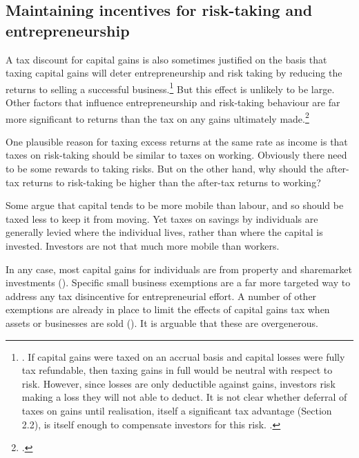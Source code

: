 \documentclass{grattanAlpha}\usepackage[]{graphicx}\usepackage[]{color}
\begin{document}
\subsection{Maintaining incentives for risk-taking and entrepreneurship}\label{subsubsec:maintain-incentives-for-risk-taking}
A tax discount for capital gains is also sometimes justified on the basis that taxing capital gains will deter entrepreneurship and risk taking by reducing the returns to selling a successful business.\footnote{\textcite[][8--11]{ClemensLammamLo2014}. If capital gains were taxed on an accrual basis and capital losses were fully tax refundable, then taxing gains in full would be neutral with respect to risk. However, since losses are only deductible against gains, investors risk making a loss they will not able to deduct. It is not clear whether deferral of taxes on gains until realisation, itself a significant tax advantage (Section 2.2), is itself enough to compensate investors for this risk. \textcites[8]{Burman2009}[130]{ProductivityCommission2004FirstHomeOwnership}.} 
But this effect is unlikely to be large. Other factors that influence entrepreneurship and risk-taking behaviour are far more significant to returns than the tax on any gains ultimately made.\footcite[][75]{Burman1999} 

One plausible reason for taxing excess returns at the same rate as income is that taxes on risk-taking should be similar to taxes on working. Obviously there need to be some rewards to taking risks. But on the other hand, why should the after-tax returns to risk-taking be higher than the after-tax returns to working? 

Some argue that capital tends to be more mobile than labour, and so should be taxed less to keep it from moving. Yet taxes on savings by individuals are generally levied where the individual lives, rather than where the capital is invested. Investors are not that much more mobile than workers.

In any case, most capital gains for individuals are from property and sharemarket investments (). Specific small business exemptions are a far more targeted way to address any tax disincentive for entrepreneurial effort. A number of other exemptions are already in place to limit the effects of capital gains tax when assets or businesses are sold (). It is arguable that these are overgenerous. 
\end{document}
